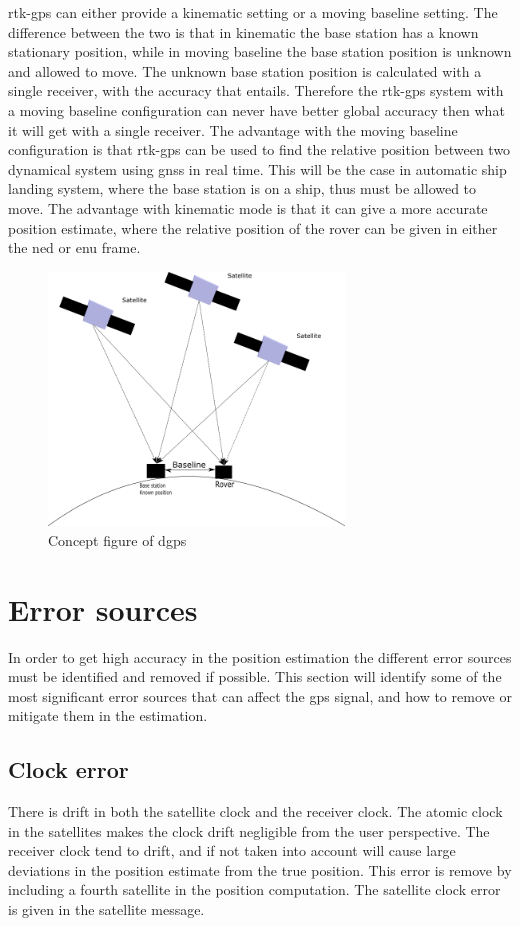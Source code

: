\gls{rtk-gps} can either provide a kinematic setting or a moving baseline setting. The difference between the two is that in kinematic the base station has a known stationary position, while in moving baseline the base station position is unknown and allowed to move. The unknown base station position is calculated with a single receiver, with the accuracy that entails. Therefore the \gls{rtk-gps} system with a moving baseline configuration can never have better global accuracy then what it will get with a single receiver. The advantage with the moving baseline configuration is that \gls{rtk-gps} can be used to find the relative position between two dynamical system using \gls{gnss} in real time. This will be the case in automatic ship landing system, where the base station is on a ship, thus must be allowed to move. The advantage with kinematic mode is that it can give a more accurate position estimate, where the relative position of the rover can be given in either the \gls{ned} or \gls{enu} frame.

\begin{figure}[H]
	\centering
		\includegraphics[width=0.7\textwidth]{figs/DGPS.png}
		\caption{Concept figure of \acrfull{dgps}}
		\label{figure:DGPS}
\end{figure}
\section{Error sources}
In order to get high accuracy in the position estimation the different error sources must be identified and removed if possible. This section will identify some of the most significant error sources that can affect the \gls{gps} signal, and how to remove or mitigate them in the estimation.
\subsection{Clock error}
There is drift in both the satellite clock and the receiver clock. The atomic clock in the satellites makes the clock drift negligible from the user perspective. The receiver clock tend to drift, and if not taken into account will cause large deviations in the position estimate from the true position. This error is remove by including a fourth satellite in the position computation. The satellite clock error is given in the satellite message. 

